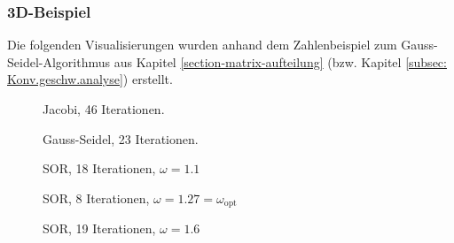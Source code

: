 \begin{refsection}
\subsubsection{3D-Beispiel}
Die folgenden Visualisierungen wurden anhand dem Zahlenbeispiel zum
Gauss-Seidel-Algorithmus aus Kapitel \ref{section-matrix-aufteilung}
(bzw. Kapitel \ref{subsec: Konv.geschw.analyse}) erstellt.
\begin{figure}[!ht]\centering
	\caption{Jacobi, 46 Iterationen.}
	\label{fig:Jac. 3D Bsp}
\end{figure}
\begin{figure}[!ht]\centering
	\caption{Gauss-Seidel, 23 Iterationen.}
	\label{fig:G.-S. 3D Bsp}
\end{figure}
\begin{figure}[!ht]\centering
	\caption{SOR, 18 Iterationen, $\omega=1.1$}
	\label{fig:SOR w=1.1 3D Bsp}
\end{figure}
\begin{figure}[!ht]\centering
	\caption{SOR, 8 Iterationen, $\omega=1.27=\omega_{\text{opt}}$}
	\label{fig:SOR w=1.27 3D Bsp}
\end{figure}
\begin{figure}[!ht]\centering
	\caption{SOR, 19 Iterationen, $\omega=1.6$}
	\label{fig:SOR w=1.6 3D Bsp}
\end{figure}
			

\end{refsection}
